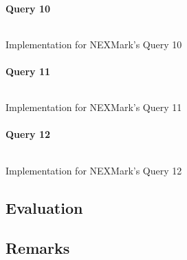 \paragraph{Query 10}
\begin{listing}[H]
  \inputminted[firstline=0,lastline=1]{rust}{benchmarks/src/nexmark.rs}
  \caption{Implementation for NEXMark's Query 10}
  \label{lst:nexmark-query10}
\end{listing}

\paragraph{Query 11}
\begin{listing}[H]
  \inputminted[firstline=0,lastline=1]{rust}{benchmarks/src/nexmark.rs}
  \caption{Implementation for NEXMark's Query 11}
  \label{lst:nexmark-query11}
\end{listing}

\paragraph{Query 12}
\begin{listing}[H]
  \inputminted[firstline=0,lastline=1]{rust}{benchmarks/src/nexmark.rs}
  \caption{Implementation for NEXMark's Query 12}
  \label{lst:nexmark-query12}
\end{listing}

\subsection{Evaluation}

\subsection{Remarks}


